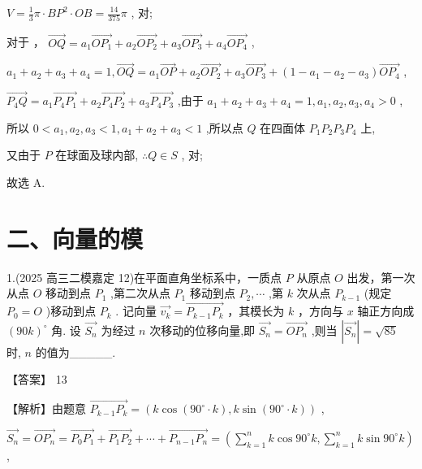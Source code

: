 \documentclass[10pt]{article}
\newcommand*\circled[1]{\tikz[baseline=(char.base)]{\node[shape=circle,draw,inner sep=1.5pt] (char) {\small #1};}}
\begin{document}
\(V = \frac{1}{3}\pi  \cdot  B{P}^{2} \cdot  {OB} = \frac{14}{375}\pi\) , \circled{1}  对;

对于 \circled{2} ， \(\overrightarrow{OQ} = {a}_{1}\overrightarrow{O{P}_{1}} + {a}_{2}\overrightarrow{O{P}_{2}} + {a}_{3}\overrightarrow{O{P}_{3}} + {a}_{4}\overrightarrow{O{P}_{4}}\) ,

\({a}_{1} + {a}_{2} + {a}_{3} + {a}_{4} = 1,\overrightarrow{OQ} = {a}_{1}\overrightarrow{OP} + {a}_{2}\overrightarrow{O{P}_{2}} + {a}_{3}\overrightarrow{O{P}_{3}} + \left( {1 - {a}_{1} - {a}_{2} - {a}_{3}}\right) \overrightarrow{O{P}_{4}}\) ,

\(\overrightarrow{{P}_{4}Q} = {a}_{1}\overrightarrow{{P}_{4}{P}_{1}} + {a}_{2}\overrightarrow{{P}_{4}{P}_{2}} + {a}_{3}\overrightarrow{{P}_{4}{P}_{3}}\) ,由于 \({a}_{1} + {a}_{2} + {a}_{3} + {a}_{4} = 1,{a}_{1},{a}_{2},{a}_{3},{a}_{4} > 0\) ,

所以 \(0 < {a}_{1},{a}_{2},{a}_{3} < 1,{a}_{1} + {a}_{2} + {a}_{3} < 1\) ,所以点 \(Q\) 在四面体 \({P}_{1}{P}_{2}{P}_{3}{P}_{4}\) 上,

又由于 \(P\) 在球面及球内部, \(\therefore Q \in  S\) , \circled{2} 对;

故选 A.

\section*{二、向量的模}

1.(2025 高三二模嘉定 12)在平面直角坐标系中，一质点 \(P\) 从原点 \(O\) 出发，第一次从点 \(O\) 移动到点 \({P}_{1}\) ,第二次从点 \({P}_{1}\) 移动到点 \({P}_{2},\cdots\) ,第 \(k\) 次从点 \({P}_{k - 1}\) (规定 \({P}_{0} = O\) )移动到点 \({P}_{k}\) . 记向量 \(\overrightarrow{{v}_{k}} = \overrightarrow{{P}_{k - 1}{P}_{k}}\) ，其模长为 \(k\) ，方向与 \(x\) 轴正方向成 \({\left( {90}k\right) }^{ \circ  }\) 角. 设 \(\overrightarrow{{S}_{n}}\) 为经过 \(n\) 次移动的位移向量,即 \(\overrightarrow{{S}_{n}} = \overrightarrow{O{P}_{n}}\) ,则当 \(\left| \overrightarrow{{S}_{n}}\right|  = \sqrt{85}\) 时, \(n\) 的值为\_\_\_\_\_.

【答案】 13

【解析】由题意 \(\overrightarrow{{P}_{k - 1}{P}_{k}} = \left( {k\cos \left( {{90}^{ \circ  } \cdot  k}\right) ,k\sin \left( {{90}^{ \circ  } \cdot  k}\right) }\right)\) ,

\(\overrightarrow{{S}_{n}} = \overrightarrow{O{P}_{n}} = \overrightarrow{{P}_{0}{P}_{1}} + \overrightarrow{{P}_{1}{P}_{2}} + \cdots  + \overrightarrow{{P}_{n - 1}{P}_{n}} = \left( {\mathop{\sum }\limits_{{k = 1}}^{n}k\cos {90}^{ \circ  }k,\mathop{\sum }\limits_{{k = 1}}^{n}k\sin {90}^{ \circ  }k}\right)\) ,
\end{document}
